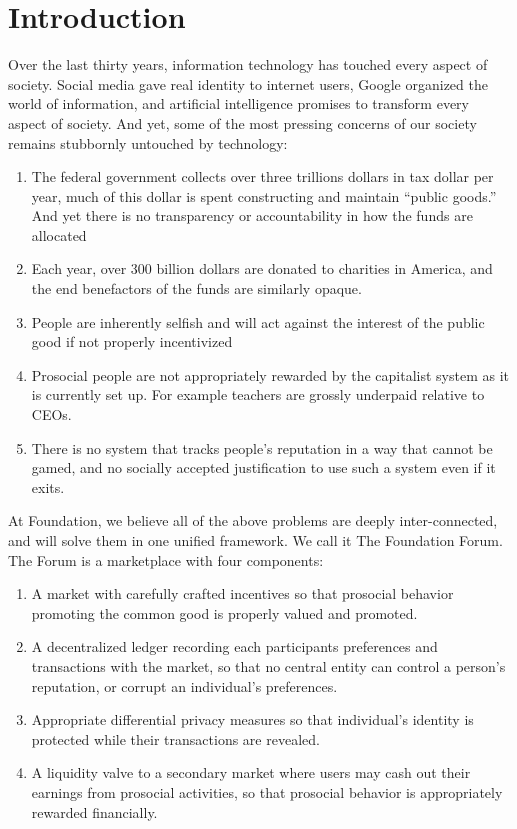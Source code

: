 \section{\textbf{Introduction}}



Over the last thirty years, information technology has touched every aspect of society. Social media gave real identity to internet users, Google organized the world of information, and artificial intelligence promises to transform every aspect of society. And yet, some of the most pressing concerns of our society remains stubbornly untouched by technology:

\begin{enumerate}
	\item The federal government collects over three trillions dollars in tax dollar per year, much of this dollar is spent constructing and maintain “public goods.” And yet there is no transparency or accountability in how the funds are allocated
	\item Each year, over 300 billion dollars are donated to charities in America, and the end benefactors of the funds are similarly opaque. 
	\item People are inherently selfish and will act against the interest of the public good if not properly incentivized
	\item Prosocial people are not appropriately rewarded by the capitalist system as it is currently set up. For example teachers are grossly underpaid relative to CEOs.
	\item There is no system that tracks people’s reputation in a way that cannot be gamed, and no socially accepted justification to use such a system even if it exits.
\end{enumerate}


At Foundation, we believe all of the above problems are deeply inter-connected, and will solve them in one unified framework. We call it The Foundation Forum. The Forum is a marketplace with four components:

\begin{enumerate}
	\item A market with carefully crafted incentives so that prosocial behavior promoting the common good is properly valued and promoted.
	\item A decentralized ledger recording each participants preferences and transactions with the market, so that no central entity can control a person’s reputation, or corrupt an individual’s preferences. 
	\item Appropriate differential privacy measures so that individual’s identity is protected while their transactions are revealed.
	\item A liquidity valve to a secondary market where users may cash out their earnings from prosocial activities, so that prosocial behavior is appropriately rewarded financially.  
\end{enumerate}


